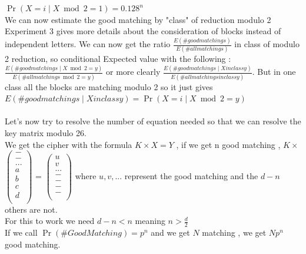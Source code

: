 \documentclass{article}
\begin{document}
$\Pr (X=i \mid X \bmod 2 = 1) = 0.128^{n}$\\
We can now estimate the good matching by "class" of reduction modulo 2
Experiment 3 gives more details about the consideration of blocks instead of independent letters.
We can now get the ratio $\frac{E(\# good matchings)}{E(\# all matchings)}$ in class of modulo 2 reduction, so conditional Expected value with the following : $\frac{E(\# good matchings \mid X \bmod 2 = y)}{E(\# all matchings \bmod 2 = y)}$ or more clearly $\frac{E(\# good matchings \mid X in class y)}{E(\# all matchings in class y)}$. But in one class all the blocks are matching modulo 2 so it just gives $E(\# good matchings \mid X in class y)  = \Pr (X=i \mid X \bmod 2 = y) $\\
\\
Let's now try to resolve the number of equation needed so that we can resolve the key matrix modulo 26.\\
We get the cipher with the formula $ K \times X = Y$ , if we get n good matching , $ K \times $  $\begin{pmatrix}
  - \\
  - \\
  ... \\
  a \\
	b\\
	c\\
	d\\
 \end{pmatrix} $
 = $\begin{pmatrix}
  u \\
  v \\
  ... \\
  - \\
	-\\
	-\\
	-\\
 \end{pmatrix}$
where $ u , v , ... $ represent the good matching and the $d-n $ others are not.\\
For this to work we need $d-n < n $ meaning $n > \frac{d}{2}$\\
If we call $\Pr(\#Good Matching)=p^n $ and we get $N$ matching , we get $N p^n$ good matching.\\
\end{document}
